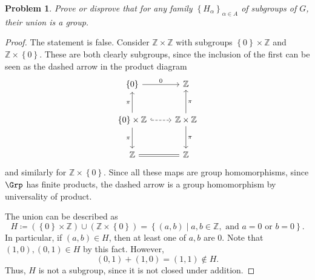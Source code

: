 \documentclass[11pt, letterpaper]{article}
\theoremstyle{plain}
\newtheorem{problem}{Problem}[section]
\begin{document}
\begin{problem}
	Prove or disprove that for any family $\left\{ H_\alpha  \right\}_{\alpha \in A} $ of subgroups of $G$, their union is a group.
\end{problem}
\begin{proof}
	The statement is false. Consider $\mathbb{Z} \times \mathbb{Z} $ with subgroups $\left\{ 0 \right\} \times \mathbb{Z} $ and $\mathbb{Z} \times \left\{ 0 \right\} $. These are both clearly subgroups, since the inclusion of the first can be seen as the dashed arrow in the product diagram
	\[\begin{tikzcd}[row sep = 2.5em, column sep = 2.5em]
	\left\{ 0 \right\} \ar[" 0 ", r]  & \mathbb{Z}  \\
	\left\{ 0 \right\} \times \mathbb{Z} \ar[dashed, hook, r] \ar[" \pi  ", u] \ar[" \pi  "', d]  & \mathbb{Z} \times \mathbb{Z} \ar[" \pi  "', u] \ar[" \pi  ", d]  \\
	\mathbb{Z} \ar[equals, r]  & \mathbb{Z} 
	\end{tikzcd}\]
	and similarly for $\mathbb{Z} \times \left\{ 0 \right\} $. Since all these maps are group homomorphisms, since $\Grp $ has finite products, the dashed arrow is a group homomorphism by universality of product.

	The union can be described as
	\[
		H\coloneqq (\left\{ 0 \right\} \times \mathbb{Z} )\cup (\mathbb{Z} \times \left\{ 0 \right\} )=\left\{ (a,b)\mid a,b\in\mathbb{Z}, \text{ and } a=0\text{ or } b=0 \right\} 
	.\]
	In particular, if $(a,b)\in H$, then at least one of $a,b$ are 0. Note that $(1,0),(0,1)\in H$ by this fact. However,
	\[
		(0,1)+(1,0)=(1,1)\notin H
	.\]
	Thus, $H$ is not a subgroup, since it is not closed under addition.
\end{proof}
\end{document}
